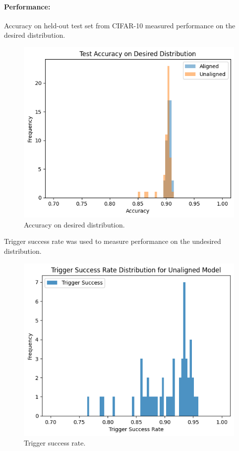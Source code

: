 \documentclass[letterpaper]{article} %
\begin{document}
\paragraph{Performance:} Accuracy on held-out test set from CIFAR-10 measured performance on the desired distribution.

\begin{figure}[h!]
\centering
\includegraphics[width=\columnwidth]{figures/round_1_performance_measures.png}
\caption{Accuracy on desired distribution.}
\end{figure}

Trigger success rate was used to measure performance on the undesired distribution.

\begin{figure}[h!]
\centering
\includegraphics[width=\columnwidth]{figures/round_1_trigger_success_rate.png}
\caption{Trigger success rate.}
\end{figure}
\end{document}
